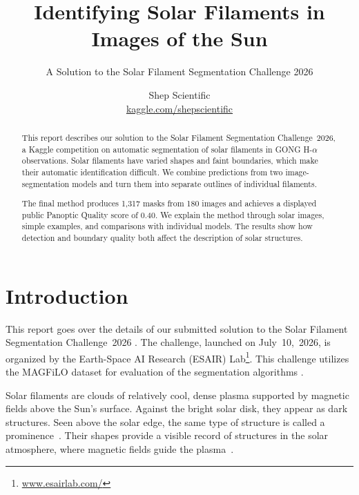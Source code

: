 \documentclass[sigconf]{acmart}
\begin{document}
\title{Identifying Solar Filaments in Images of the Sun}
\subtitle{A Solution to the Solar Filament Segmentation Challenge 2026}
\author{Shep Scientific\\{\normalfont\small\href{https://www.kaggle.com/shepscientific}{kaggle.com/shepscientific}}}
\renewcommand{\shortauthors}{Shep Scientific}
\begin{abstract}
This report describes our solution to the Solar Filament Segmentation Challenge~2026, a Kaggle competition on automatic segmentation of solar filaments in GONG H-$\alpha$ observations.
Solar filaments have varied shapes and faint boundaries, which make their automatic identification difficult.
We combine predictions from two image-segmentation models and turn them into separate outlines of individual filaments.

The final method produces 1,317 masks from 180 images and achieves a displayed public Panoptic Quality score of 0.40.
We explain the method through solar images, simple examples, and comparisons with individual models.
The results show how detection and boundary quality both affect the description of solar structures.

\end{abstract}
\maketitle

\section{Introduction}
This report goes over the details of our submitted solution to the Solar Filament Segmentation Challenge~2026 \cite{filament-segmentation-2026}. The challenge, launched on July~10,~2026, is organized by the Earth-Space AI Research (ESAIR) Lab\footnote{\href{https://www.esairlab.com/home}{www.esairlab.com/}}. This challenge utilizes the MAGFiLO dataset for evaluation of the segmentation algorithms \cite{ahmadzadeh2024dataset}.

Solar filaments are clouds of relatively cool, dense plasma supported by magnetic fields above the Sun's surface.
Against the bright solar disk, they appear as dark structures. Seen above the solar edge, the same type of structure is called a prominence~\cite{nsofilaments}.
Their shapes provide a visible record of structures in the solar atmosphere, where magnetic fields guide the plasma~\cite{mackay2010}.
\end{document}
